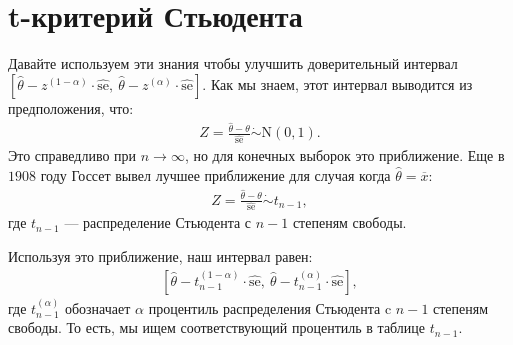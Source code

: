 
\section{t-критерий Стьюдента}
Давайте используем эти знания чтобы улучшить доверительный интервал $
[ \widehat{\theta} - z^{(1 - \alpha) } \cdot \widehat{\text{se}}, \ \widehat{\theta} - z^{(\alpha)} \cdot \widehat{\text{se}}]$. Как мы знаем, этот интервал выводится из предположения, что:
\begin{gather}\label{12.17}
Z = \frac{\widehat{\theta} - \theta}{\widehat{\text{se}}} \dot{\sim} \mathrm{N}(0, 1).
\end{gather}
Это справедливо при $ n \rightarrow \infty $, но для конечных выборок это приближение. Еще в $ 1908 $ году Госсет вывел лучшее приближение для случая когда $ \widehat{\theta} = \overline{x}$:
\begin{gather}\label{12.18}
Z = \frac{\widehat{\theta} - \theta}{\widehat{\text{se}}} \dot{\sim} t_{n - 1},
\end{gather}
где $t_{n - 1}$ --- распределение Стьюдента с $n - 1$ степеням свободы. 
\begin{figure}[H]
\end{figure}
Используя это приближение, наш интервал равен: 
\begin{gather}\label{12.19}
[ \widehat{\theta} - t^{(1 - \alpha)}_{n-1} \cdot \widehat{\text{se}},\ \widehat{\theta} - t^{(\alpha)}_{n-1} \cdot \widehat{\text{se}}],
\end{gather}
где $t^{(\alpha)}_{n-1}$ обозначает $\alpha$ процентиль распределения Стьюдента c $n - 1$ степеням свободы. То есть, мы ищем соответствующий процентиль в таблице $t_{n-1}$.

